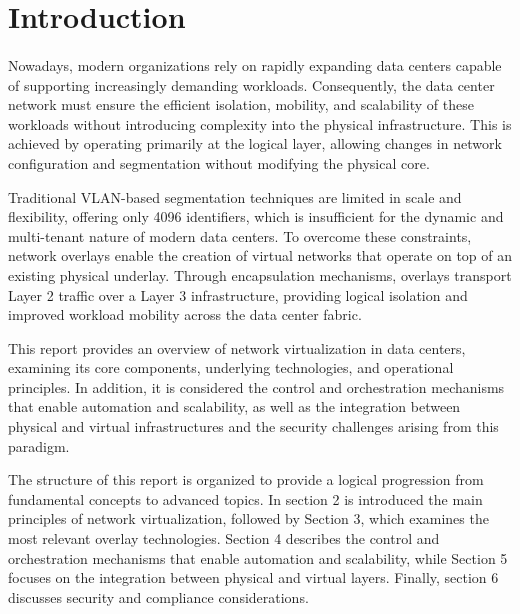 \section{Introduction}
\paragraph{}
Nowadays, modern organizations rely on rapidly expanding data centers capable of supporting increasingly demanding workloads. Consequently, the data center network must ensure the efficient isolation, mobility, and scalability of these workloads without introducing complexity into the physical infrastructure. This is achieved by operating primarily at the logical layer, allowing changes in network configuration and segmentation without modifying the physical core.

Traditional VLAN-based segmentation techniques are limited in scale and flexibility, offering only 4096 identifiers, which is insufficient for the dynamic and multi-tenant nature of modern data centers. To overcome these constraints, network overlays enable the creation of virtual networks that operate on top of an existing physical underlay. Through encapsulation mechanisms, overlays transport Layer 2 traffic over a Layer 3 infrastructure, providing logical isolation and improved workload mobility across the data center fabric.

This report provides an overview of network virtualization in data centers, examining its core components, underlying technologies, and operational principles. In addition, it is considered the control and orchestration mechanisms that enable automation and scalability, as well as the integration between physical and virtual infrastructures and the security challenges arising from this paradigm.

The structure of this report is organized to provide a logical progression from fundamental concepts to advanced topics. In section 2 is introduced the main principles of network virtualization, followed by Section 3, which examines the most relevant overlay technologies. Section 4 describes the control and orchestration mechanisms that enable automation and scalability, while Section 5 focuses on the integration between physical and virtual layers. Finally, section 6 discusses security and compliance considerations.